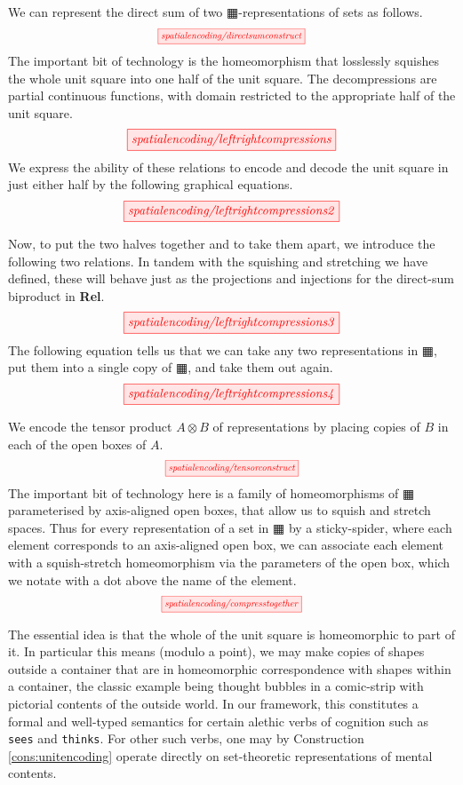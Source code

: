 \begin{myboxB}
\begin{construction}
We can represent the direct sum of two $\squarehvfill$-representations of sets as follows.
\[\scalebox{0.75}{\tikzfig{spatialencoding/directsumconstruct}}\]
The important bit of technology is the homeomorphism that losslessly squishes the whole unit square into one half of the unit square. The decompressions are partial continuous functions, with domain restricted to the appropriate half of the unit square.
\[\scalebox{1}{\tikzfig{spatialencoding/leftrightcompressions}}\]
We express the ability of these relations to encode and decode the unit square in just either half by the following graphical equations.
\[\scalebox{1}{\tikzfig{spatialencoding/leftrightcompressions2}}\]
\end{construction}
Now, to put the two halves together and to take them apart, we introduce the following two relations. In tandem with the squishing and stretching we have defined, these will behave just as the projections and injections for the direct-sum biproduct in \textbf{Rel}.
\[\scalebox{1}{\tikzfig{spatialencoding/leftrightcompressions3}}\]
The following equation tells us that we can take any two representations in $\squarehvfill$, put them into a single copy of $\squarehvfill$, and take them out again.
\[\scalebox{1}{\tikzfig{spatialencoding/leftrightcompressions4}}\]
\end{myboxB}

\begin{myboxB}
We encode the tensor product $A \otimes B$ of representations by placing copies of $B$ in each of the open boxes of $A$.
\[\scalebox{0.75}{\tikzfig{spatialencoding/tensorconstruct}}\]
The important bit of technology here is a family of homeomorphisms of $\squarehvfill$ parameterised by axis-aligned open boxes, that allow us to squish and stretch spaces. Thus for every representation of a set in $\squarehvfill$ by a sticky-spider, where each element corresponds to an axis-aligned open box, we can associate each element with a squish-stretch homeomorphism via the parameters of the open box, which we notate with a dot above the name of the element.
\[\scalebox{0.75}{\tikzfig{spatialencoding/compresstogether}}\]
\begin{remark}
The essential idea is that the whole of the unit square is homeomorphic to part of it. In particular this means (modulo a point), we may make copies of shapes outside a container that are in homeomorphic correspondence with shapes within a container, the classic example being thought bubbles in a comic-strip with pictorial contents of the outside world. In our framework, this constitutes a formal and well-typed semantics for certain alethic verbs of cognition such as \texttt{sees} and \texttt{thinks}. For other such verbs, one may by Construction \ref{cons:unitencoding} operate directly on set-theoretic representations of mental contents.
\end{remark}
\end{myboxB}

